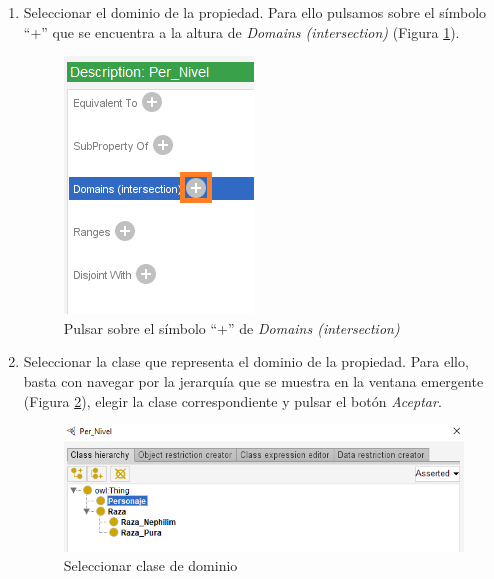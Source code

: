 \begin{enumerate}
    \item Seleccionar el dominio de la propiedad. Para ello pulsamos sobre el símbolo “+” que se encuentra a la altura de 
    \textit{Domains (intersection)} (Figura \ref*{CreateDataProp_3}).
    \begin{figure}[ht]
        \centering
        \includegraphics[scale=0.6]{Figures/Protege/CreateDataProp_3.png}
        \caption{Pulsar sobre el símbolo “+” de \textit{Domains (intersection)}}
        \label{CreateDataProp_3}
    \end{figure}

    \item Seleccionar la clase que representa el dominio de la propiedad. Para ello, basta con navegar por la 
    jerarquía que se muestra en la ventana emergente (Figura \ref*{CreateDataProp_4}), elegir la clase correspondiente 
    y pulsar el botón \textit{Aceptar}.

    \begin{figure}[ht]
        \centering
        \includegraphics[scale=0.6]{Figures/Protege/CreateDataProp_4.png}
        \caption{Seleccionar clase de dominio}
        \label{CreateDataProp_4}
    \end{figure}


\end{enumerate}
